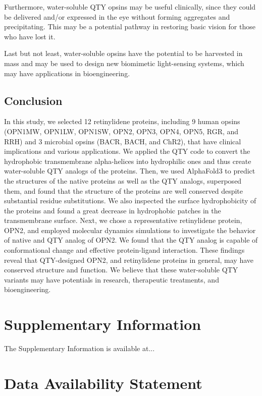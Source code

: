 \documentclass[fleqn, 10pt]{manuscript}
\begin{document}
Furthermore, water-soluble QTY opsins may be useful clinically, since they could be delivered and/or expressed in the eye without forming aggregates and precipitating. This may be a potential pathway in restoring basic vision for those who have lost it. 

Last but not least, water-soluble opsins have the potential to be harvested in mass and may be used to design new biomimetic light-sensing systems, which may have applications in bioengineering. 

\subsection*{Conclusion}

In this study, we selected 12 retinylidene proteins, including 9 human opsins (OPN1MW, OPN1LW, OPN1SW, OPN2, OPN3, OPN4, OPN5, RGR, and RRH) and 3 microbial opsins (BACR, BACH, and ChR2), that have clinical implications and various applications. We applied the QTY code to convert the hydrophobic transmembrane alpha-helices into hydrophilic ones and thus create water-soluble QTY analogs of the proteins. Then, we used AlphaFold3 to predict the structures of the native proteins as well as the QTY analogs, superposed them, and found that the structure of the proteins are well conserved despite substantial residue substitutions. We also inspected the surface hydrophobicity of the proteins and found a great decrease in hydrophobic patches in the transmembrane surface. Next, we chose a representative retinylidene protein, OPN2, and employed molecular dynamics simulations to investigate the behavior of native and QTY analog of OPN2. We found that the QTY analog is capable of conformational change and effective protein-ligand interaction. These findings reveal that QTY-designed OPN2, and retinylidene proteins in general, may have conserved structure and function. We believe that these water-soluble QTY variants may have potentials in research, therapeutic treatments, and bioengineering. 


\section*{Supplementary Information} 

The Supplementary Information is available at...

\section*{Data Availability Statement} 
\end{document}
